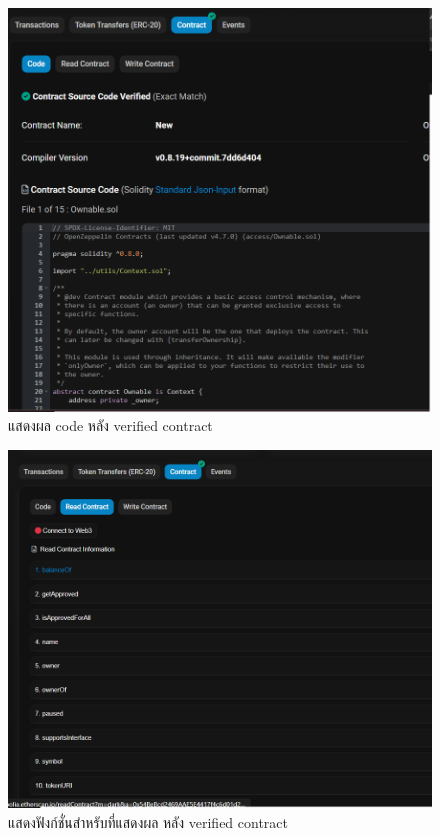 \documentclass[12pt,oneside,openright,a4paper]{cpe-thai-project}
\begin{document}
\begin{figure}[!thb]
			\centering
			\includegraphics[scale=0.5]{etherscan}
			\caption{แสดงผล code หลัง verified contract}
		\end{figure}
\begin{figure}[!thb]
			\centering
			\includegraphics[scale=0.5]{etherscanRead}
			\caption{แสดงฟังก์ชั่นสำหรับที่แสดงผล หลัง verified contract}
		\end{figure}
\end{document}
